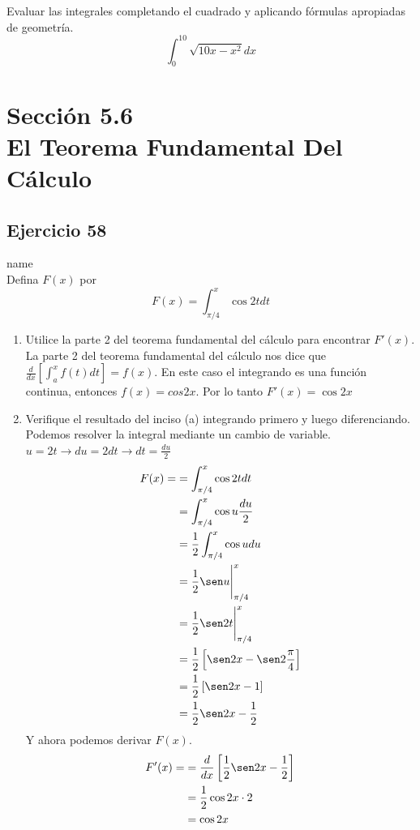 \documentclass[12pt]{article}
\begin{document}
Evaluar las integrales completando el cuadrado y aplicando fórmulas apropiadas de geometría.
\[
\int_{0}^{10} \sqrt{10x-x^2}dx
\]

\section{Sección 5.6 \\ El Teorema Fundamental Del Cálculo}
\subsection{Ejercicio 58} name \\

Defina $F (x)$ por
\[
F(x)=\int_{\pi/4}^{x} \cos{2t} dt
\]
\begin{enumerate}[label=(\alph*)]
\item Utilice la parte 2 del teorema fundamental del cálculo para encontrar $F'(x)$. \\
  La parte 2 del teorema fundamental del cálculo nos dice que $\frac{d}{dx}\left[ \int_{a}^{x} f(t)dt \right] = f(x)$. En este caso el integrando es una función continua, entonces $f(x) = cos2x$. Por lo tanto $F'(x) = \cos{2x}$
\item Verifique el resultado del inciso (a) integrando primero y luego diferenciando. \\
Podemos resolver la integral mediante un cambio de variable. $u= 2t \rightarrow du = 2dt  \rightarrow dt = \frac{du}{2}$\\
\begin{align*}
  F(x)=
  & = \int_{\pi/4}^{x} \cos{2t} dt \\
  & = \int_{\pi/4}^{x} \cos{u} \frac{du}{2}\\
  & = \frac{1}{2} \int_{\pi/4}^{x} \cos{u} du \\
  & = \frac{1}{2} \sen u \Bigg|_{\pi/4}^{x} \\
  & = \frac{1}{2} \sen 2t \Bigg|_{\pi/4}^{x} \\
  & = \frac{1}{2} \left[  \sen 2x - \sen 2\frac{\pi}{4} \right] \\
  & = \frac{1}{2} \left[  \sen 2x - 1 \right]\\
  & = \frac{1}{2}  \sen 2x - \frac{1}{2}  
\end{align*}
Y ahora podemos derivar $F(x)$.
\begin{align*}
  F'(x)=
  & = \frac{d}{dx} \left[ \frac{1}{2}  \sen 2x - \frac{1}{2} \right]  \\
  & = \frac{1}{2}  \cos 2x \cdot 2 \\
  & = \cos 2x  \\
\end{align*}
\end{enumerate}
\end{document}
